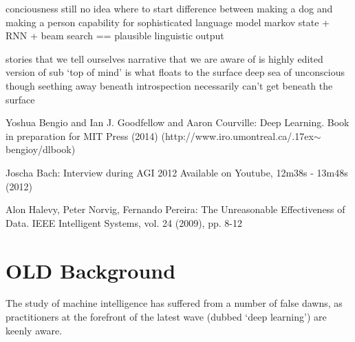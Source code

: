 \documentclass[citeauthoryear]{llncs}
\begin{document}
conciousness 
  still no idea where to start
  difference between making a dog and making a person
    capability for sophisticated language model
      markov state + RNN + beam search == plausible linguistic output
  
  stories that we tell ourselves
    narrative that we are aware of is highly edited version of sub
      `top of mind' is what floats to the surface
      deep sea of unconscious though seething away beneath
  introspection necessarily can't get beneath the surface

%
%
\begin{thebibliography}{}
%
\newcommand{\mytilde}{\raise.17ex\hbox{$\scriptstyle\mathtt{\sim}$}}

Yoshua Bengio and Ian J. Goodfellow and Aaron Courville:
Deep Learning.
Book in preparation for MIT Press (2014)
(http://www.iro.umontreal.ca/\mytilde{}bengioy/dlbook)

Joscha Bach:
Interview during AGI 2012
Available on Youtube, 12m38s - 13m48s (2012)

Alon Halevy, Peter Norvig, Fernando Pereira:
The Unreasonable Effectiveness of Data.
IEEE Intelligent Systems, vol. 24 (2009), pp. 8-12

%
%
%
%

\end{thebibliography}

\newpage

\section{OLD Background}
The study of machine intelligence has suffered from a number of false dawns, 
as practitioners at the forefront of the latest wave (dubbed `deep learning') 
are keenly aware.  
%
\end{document}
